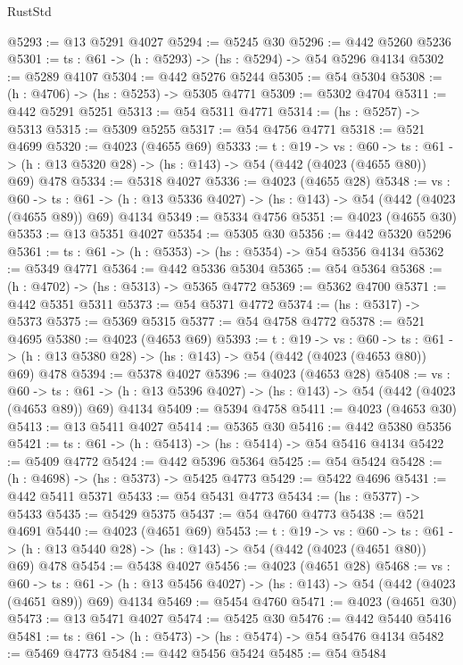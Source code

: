 \begin{lexlean}{RustStd}
\begin{coremodule}
@5293 := @13 @5291 @4027
@5294 := @5245 @30
@5296 := @442 @5260 @5236
@5301 := {ts : @61} -> (h : @5293) -> (hs : @5294) -> @54 @5296 @4134
@5302 := @5289 @4107
@5304 := @442 @5276 @5244
@5305 := @54 @5304
@5308 := (h : @4706) -> (hs : @5253) -> @5305 @4771
@5309 := @5302 @4704
@5311 := @442 @5291 @5251
@5313 := @54 @5311 @4771
@5314 := (hs : @5257) -> @5313
@5315 := @5309 @5255
@5317 := @54 @4756 @4771
@5318 := @521 @4699
@5320 := @4023 (@4655 @69)
@5333 := {t : @19} ->
  {vs : @60} ->
  {ts : @61} -> (h : @13 @5320 @28) -> (hs : @143) -> @54 (@442 (@4023 (@4655 @80)) @69) @478
@5334 := @5318 @4027
@5336 := @4023 (@4655 @28)
@5348 := {vs : @60} ->
  {ts : @61} -> (h : @13 @5336 @4027) -> (hs : @143) -> @54 (@442 (@4023 (@4655 @89)) @69) @4134
@5349 := @5334 @4756
@5351 := @4023 (@4655 @30)
@5353 := @13 @5351 @4027
@5354 := @5305 @30
@5356 := @442 @5320 @5296
@5361 := {ts : @61} -> (h : @5353) -> (hs : @5354) -> @54 @5356 @4134
@5362 := @5349 @4771
@5364 := @442 @5336 @5304
@5365 := @54 @5364
@5368 := (h : @4702) -> (hs : @5313) -> @5365 @4772
@5369 := @5362 @4700
@5371 := @442 @5351 @5311
@5373 := @54 @5371 @4772
@5374 := (hs : @5317) -> @5373
@5375 := @5369 @5315
@5377 := @54 @4758 @4772
@5378 := @521 @4695
@5380 := @4023 (@4653 @69)
@5393 := {t : @19} ->
  {vs : @60} ->
  {ts : @61} -> (h : @13 @5380 @28) -> (hs : @143) -> @54 (@442 (@4023 (@4653 @80)) @69) @478
@5394 := @5378 @4027
@5396 := @4023 (@4653 @28)
@5408 := {vs : @60} ->
  {ts : @61} -> (h : @13 @5396 @4027) -> (hs : @143) -> @54 (@442 (@4023 (@4653 @89)) @69) @4134
@5409 := @5394 @4758
@5411 := @4023 (@4653 @30)
@5413 := @13 @5411 @4027
@5414 := @5365 @30
@5416 := @442 @5380 @5356
@5421 := {ts : @61} -> (h : @5413) -> (hs : @5414) -> @54 @5416 @4134
@5422 := @5409 @4772
@5424 := @442 @5396 @5364
@5425 := @54 @5424
@5428 := (h : @4698) -> (hs : @5373) -> @5425 @4773
@5429 := @5422 @4696
@5431 := @442 @5411 @5371
@5433 := @54 @5431 @4773
@5434 := (hs : @5377) -> @5433
@5435 := @5429 @5375
@5437 := @54 @4760 @4773
@5438 := @521 @4691
@5440 := @4023 (@4651 @69)
@5453 := {t : @19} ->
  {vs : @60} ->
  {ts : @61} -> (h : @13 @5440 @28) -> (hs : @143) -> @54 (@442 (@4023 (@4651 @80)) @69) @478
@5454 := @5438 @4027
@5456 := @4023 (@4651 @28)
@5468 := {vs : @60} ->
  {ts : @61} -> (h : @13 @5456 @4027) -> (hs : @143) -> @54 (@442 (@4023 (@4651 @89)) @69) @4134
@5469 := @5454 @4760
@5471 := @4023 (@4651 @30)
@5473 := @13 @5471 @4027
@5474 := @5425 @30
@5476 := @442 @5440 @5416
@5481 := {ts : @61} -> (h : @5473) -> (hs : @5474) -> @54 @5476 @4134
@5482 := @5469 @4773
@5484 := @442 @5456 @5424
@5485 := @54 @5484

\end{coremodule}
\end{lexlean}
